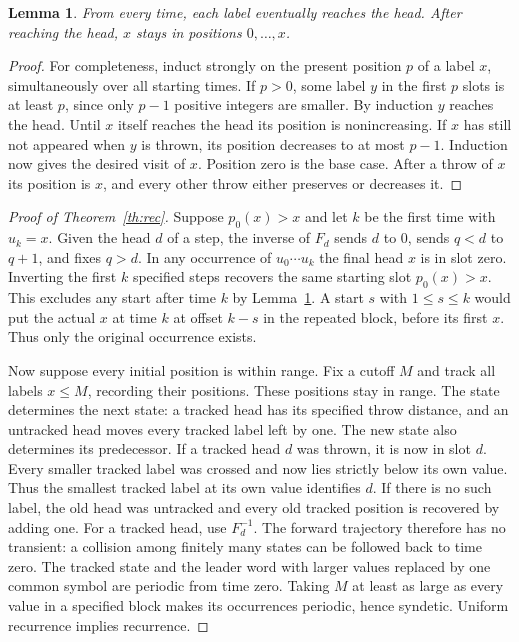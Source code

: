 \documentclass[11pt]{article}
\newtheorem{lemma}[theorem]{Lemma}
\begin{document}
\begin{lemma}\label{lem:hit}
From every time, each label eventually reaches the head. After reaching the head, $x$ stays
in positions $0,\ldots,x$.
\end{lemma}
\begin{proof}
For completeness, induct strongly on the present position $p$ of a label $x$, simultaneously
over all starting times. If $p>0$, some label $y$ in the first $p$ slots is at least $p$,
since only $p-1$ positive integers are smaller. By induction $y$ reaches the head. Until
$x$ itself reaches the head its position is nonincreasing. If $x$ has still not appeared
when $y$ is thrown, its position decreases to at most $p-1$. Induction now gives the desired
visit of $x$. Position zero is the base case. After a throw of $x$ its position is $x$,
and every other throw either preserves or decreases it.
\end{proof}

\begin{proof}[Proof of Theorem~\ref{th:rec}]
Suppose $p_0(x)>x$ and let $k$ be the first time with $u_k=x$.
Given the head $d$ of a step, the inverse of $F_d$ sends $d$ to $0$, sends $q<d$ to $q+1$,
and fixes $q>d$. In any occurrence of $u_0\cdots u_k$ the final head $x$ is in slot zero.
Inverting the first $k$ specified steps recovers the same starting slot $p_0(x)>x$.
This excludes any start after time $k$ by Lemma~\ref{lem:hit}. A start $s$ with
$1\le s\le k$ would put the actual $x$ at time $k$ at offset $k-s$ in the repeated block,
before its first $x$. Thus only the original occurrence exists.

Now suppose every initial position is within range. Fix a cutoff $M$ and track all labels
$x\le M$, recording their positions. These positions stay in range. The state determines
the next state: a tracked head has its specified throw distance, and an untracked head
moves every tracked label left by one. The new state also determines its predecessor.
If a tracked head $d$ was thrown, it is now in slot $d$. Every smaller tracked label was
crossed and now lies strictly below its own value. Thus the smallest tracked label at its
own value identifies $d$. If there is no such label, the old head was untracked and every
old tracked position is recovered by adding one. For a tracked head, use $F_d^{-1}$.
The forward trajectory therefore has no transient: a collision among finitely many states
can be followed back to time zero. The tracked state and the leader word with larger
values replaced by one common symbol are periodic from time zero. Taking $M$ at least
as large as every value in a specified block makes its occurrences periodic, hence
syndetic. Uniform recurrence implies recurrence.
\end{proof}
\end{document}
